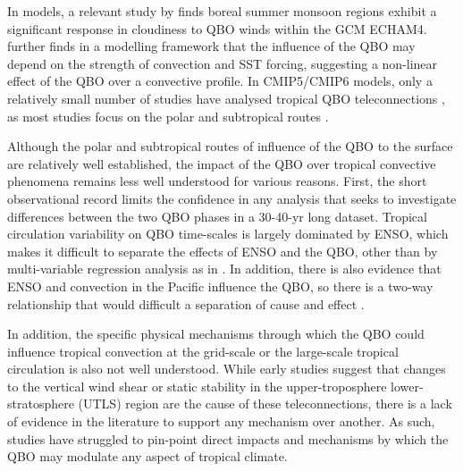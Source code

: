 In models, a relevant study by \cite{giorgetta1999} finds boreal summer monsoon regions exhibit a significant response in cloudiness to QBO winds within the GCM ECHAM4. 
\cite{nie2015} further finds in a modelling framework that the influence of the QBO may depend on the strength of convection and SST forcing, suggesting a non-linear effect of the QBO over a convective profile. In CMIP5/CMIP6 models, only a relatively small number of studies have analysed tropical QBO teleconnections \citep{serva2021}, as most studies focus on the polar and subtropical routes \citep{richter2020,anstey2021}. 

 Although the polar and subtropical routes of influence of the QBO to the surface are relatively well established, the impact of the QBO over tropical convective phenomena remains less well understood for various reasons. First, the short observational record limits the confidence in any analysis that seeks to investigate differences between the two QBO phases in a 30-40-yr long dataset. Tropical circulation variability on QBO time-scales is largely dominated by ENSO, which makes it difficult to separate the effects of ENSO and the QBO, other than by multi-variable regression analysis as in \cite{gray2018}. In addition, there is also evidence that ENSO and convection in the Pacific influence the QBO, so there is a two-way relationship that would difficult a separation of cause and effect \citep{schirber2015,christiansen2016}. 
 
 
In addition, the specific physical mechanisms through which the QBO could influence tropical convection at the grid-scale or the large-scale tropical circulation is also not well understood. 
While early studies \citep{gray1984,collimore2003} suggest that changes to the vertical wind shear or static stability in the upper-troposphere lower-stratosphere (UTLS) region are the cause of these teleconnections, there is a lack of evidence in the literature to support any mechanism over another. 
As such, studies have struggled to pin-point direct impacts and mechanisms by which the QBO may modulate any aspect of tropical climate. 

